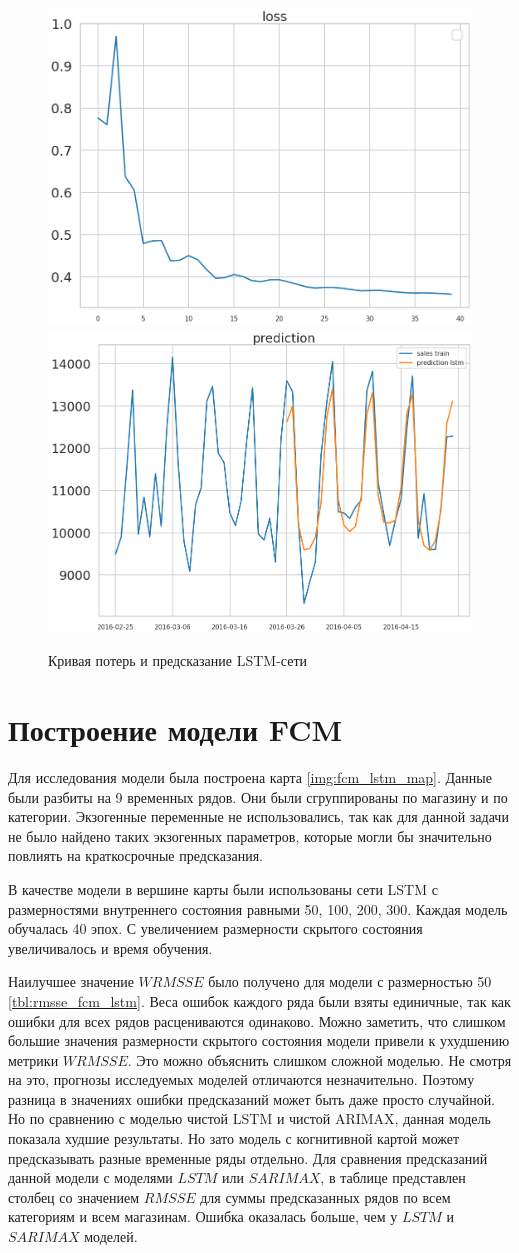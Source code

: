 \def\figurename{Рис}
\begin{figure}[t]
	\centering
	\includegraphics[width=0.4\columnwidth]{./img/lstm_loss.png}
	\includegraphics[width=0.4\columnwidth]{./img/lstm_prediction.png}
	\caption{Кривая потерь и предсказание LSTM-сети}
	\label{img:lstm_forecast}
\end{figure}

\section{Построение модели FCM}

Для исследования модели была построена карта \ref{img:fcm_lstm_map}.
Данные были разбиты на 9 временных рядов. Они были сгруппированы по
магазину и по категории. Экзогенные переменные не использовались,
так как для данной задачи не было найдено таких экзогенных параметров,
которые могли бы значительно повлиять на краткосрочные предсказания.

В качестве модели в вершине карты были использованы сети LSTM с размерностями
внутреннего состояния равными 50, 100, 200, 300. Каждая модель обучалась 40 эпох.
С увеличением размерности скрытого состояния увеличивалось и время обучения.

Наилучшее значение $ WRMSSE $ было получено для модели с размерностью 50 \ref{tbl:rmsse_fcm_lstm}.
Веса ошибок каждого ряда были взяты единичные, так как ошибки для всех рядов расцениваются одинаково.
Можно заметить, что слишком большие значения размерности скрытого состояния модели
привели к ухудшению метрики $ WRMSSE $. Это можно объяснить слишком сложной моделью.
Не смотря на это, прогнозы исследуемых моделей отличаются незначительно.
Поэтому разница в значениях ошибки предсказаний может быть даже просто случайной.
Но по сравнению с моделью чистой LSTM и чистой ARIMAX, данная модель показала худшие результаты.
Но зато модель с когнитивной картой может предсказывать разные временные ряды отдельно.
Для сравнения предсказаний данной модели с моделями $ LSTM $ или $ SARIMAX $, в
таблице представлен столбец со значением $ RMSSE $ для суммы предсказанных рядов
по всем категориям и всем магазинам. Ошибка оказалась больше, чем у  $ LSTM $ и $ SARIMAX $
моделей.

